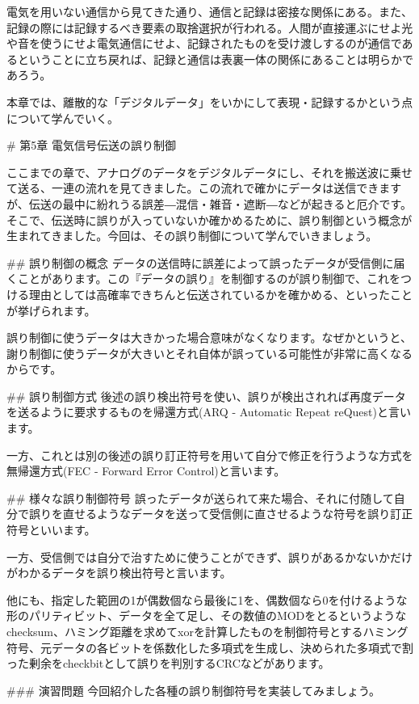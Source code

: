 電気を用いない通信から見てきた通り、通信と記録は密接な関係にある。また、記録の際には記録するべき要素の取捨選択が行われる。人間が直接運ぶにせよ光や音を使うにせよ電気通信にせよ、記録されたものを受け渡しするのが通信であるということに立ち戻れば、記録と通信は表裏一体の関係にあることは明らかであろう。

本章では、離散的な「デジタルデータ」をいかにして表現・記録するかという点について学んでいく。


# 第5章 電気信号伝送の誤り制御

ここまでの章で、アナログのデータをデジタルデータにし、それを搬送波に乗せて送る、一連の流れを見てきました。この流れで確かにデータは送信できますが、伝送の最中に紛れうる誤差―混信・雑音・遮断―などが起きると厄介です。そこで、伝送時に誤りが入っていないか確かめるために、誤り制御という概念が生まれてきました。今回は、その誤り制御について学んでいきましょう。

## 誤り制御の概念
データの送信時に誤差によって誤ったデータが受信側に届くことがあります。この『データの誤り』を制御するのが誤り制御で、これをつける理由としては高確率できちんと伝送されているかを確かめる、といったことが挙げられます。

誤り制御に使うデータは大きかった場合意味がなくなります。なぜかというと、謝り制御に使うデータが大きいとそれ自体が誤っている可能性が非常に高くなるからです。

## 誤り制御方式
後述の誤り検出符号を使い、誤りが検出されれば再度データを送るように要求するものを帰還方式(ARQ - Automatic Repeat reQuest)と言います。

一方、これとは別の後述の誤り訂正符号を用いて自分で修正を行うような方式を無帰還方式(FEC - Forward Error Control)と言います。

## 様々な誤り制御符号
誤ったデータが送られて来た場合、それに付随して自分で誤りを直せるようなデータを送って受信側に直させるような符号を誤り訂正符号といいます。

一方、受信側では自分で治すために使うことができず、誤りがあるかないかだけがわかるデータを誤り検出符号と言います。

他にも、指定した範囲の1が偶数個なら最後に1を、偶数個なら0を付けるような形のパリティビット、データを全て足し、その数値のMODをとるというようなchecksum、ハミング距離を求めてxorを計算したものを制御符号とするハミング符号、元データの各ビットを係数化した多項式を生成し、決められた多項式で割った剰余をcheckbitとして誤りを判別するCRCなどがあります。

### 演習問題
今回紹介した各種の誤り制御符号を実装してみましょう。

